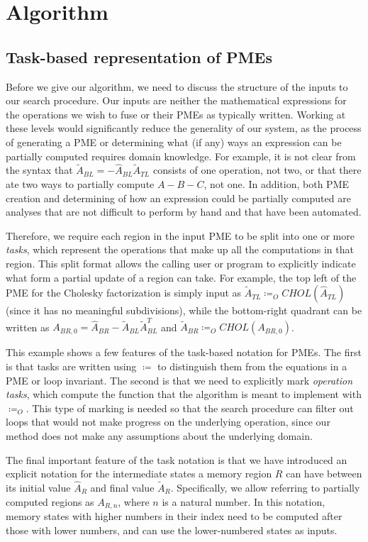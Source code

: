 \documentclass[12pt,letterpaper]{article}
\begin{document}
\section{Algorithm}
\subsection{Task-based representation of PMEs}
Before we give our algorithm, we need to discuss the structure of the inputs to our search procedure.
Our inputs are neither the mathematical expressions for the operations we wish to fuse or their PMEs as typically written.
Working at these levels would significantly reduce the generality of our system, as the process of generating a PME or determining what (if any) ways an expression can be partially computed requires domain knowledge.
For example, it is not clear from the syntax that $\widetilde{A}_{BL} = -\hat{A}_{BL}\widetilde{A}_{TL}$ consists of one operation, not two, or that there ate two ways to partially compute $A - B - C$, not one.
In addition, both PME creation and determining of how an expression could be partially computed are analyses that are not difficult to perform by hand and that have been automated.

Therefore, we require each region in the input PME to be split into one or more \emph{tasks}, which represent the operations that make up all the computations in that region.
This split format allows the calling user or program to explicitly indicate what form a partial update of a region can take.
For example, the top left of the PME for the Cholesky factorization is simply input as $\widetilde{A}_{TL} \coloneqq_O CHOL(\hat{A}_{TL})$ (since it has no meaningful subdivisions), while the bottom-right quadrant can be written as $A_{BR, 0} = \hat{A}_{BR} - \widetilde{A}_{BL}\widetilde{A}_{BL}^T$ and $\widetilde{A}_{BR} \coloneqq_O CHOL(A_{BR, 0})$.

This example shows a few features of the task-based notation for PMEs.
The first is that tasks are written using $\coloneqq$ to distinguish them from the equations in a PME or loop invariant.
The second is that we need to explicitly mark \emph{operation tasks}, which compute the function that the algorithm is meant to implement with $\coloneqq_O$.
This type of marking is needed so that the search procedure can filter out loops that would not make progress on the underlying operation, since our method does not make any assumptions about the underlying domain.

The final important feature of the task notation is that we have introduced an explicit notation for the intermediate states a memory region $R$ can have between its initial value $\hat{A}_R$ and final value $\widetilde{A}_R$.
Specifically, we allow referring to partially computed regions as $A_{R, n}$, where $n$ is a natural number.
In this notation, memory states with higher numbers in their index need to be computed after those with lower numbers, and can use the lower-numbered states as inputs.
\end{document}
